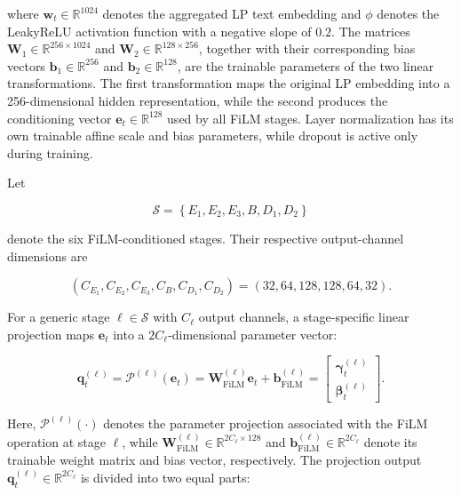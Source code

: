 where $\mathbf{w}_t\in\mathbb{R}^{1024}$ denotes the aggregated LP text
embedding and $\phi$ denotes the LeakyReLU activation function with a negative
slope of $0.2$. The matrices
$\mathbf{W}_1\in\mathbb{R}^{256\times1024}$ and
$\mathbf{W}_2\in\mathbb{R}^{128\times256}$, together with their corresponding
bias vectors $\mathbf{b}_1\in\mathbb{R}^{256}$ and
$\mathbf{b}_2\in\mathbb{R}^{128}$, are the trainable parameters of the two
linear transformations. The first transformation maps the original LP
embedding into a 256-dimensional hidden representation, while the second
produces the conditioning vector
$\mathbf{e}_t\in\mathbb{R}^{128}$ used by all FiLM stages. Layer
normalization has its own trainable affine scale and bias parameters, while
dropout is active only during training.

Let

\begin{equation}\label{eq:ch3:film_stage_set}
\mathcal{S}
=
\left\{
E_1,E_2,E_3,B,D_1,D_2
\right\}
\end{equation}

denote the six FiLM-conditioned stages. Their respective output-channel
dimensions are

\begin{equation}\label{eq:ch3:film_stage_channels}
\left(
C_{E_1},
C_{E_2},
C_{E_3},
C_B,
C_{D_1},
C_{D_2}
\right)
=
\left(
32,64,128,128,64,32
\right).
\end{equation}

For a generic stage $\ell\in\mathcal{S}$ with $C_\ell$ output channels, a
stage-specific linear projection maps $\mathbf{e}_t$ into a
$2C_\ell$-dimensional parameter vector:

\begin{equation}\label{eq:ch3:film_parameters}
\mathbf{q}^{(\ell)}_t
=
\mathcal{P}^{(\ell)}
\left(
\mathbf{e}_t
\right)
=
\mathbf{W}_{\mathrm{FiLM}}^{(\ell)}
\mathbf{e}_t
+
\mathbf{b}_{\mathrm{FiLM}}^{(\ell)}
=
\begin{bmatrix}
\boldsymbol{\gamma}^{(\ell)}_t\\
\boldsymbol{\beta}^{(\ell)}_t
\end{bmatrix}.
\end{equation}

Here, $\mathcal{P}^{(\ell)}(\cdot)$ denotes the parameter projection associated
with the FiLM operation at stage $\ell$, while
$\mathbf{W}_{\mathrm{FiLM}}^{(\ell)}
\in\mathbb{R}^{2C_\ell\times128}$ and
$\mathbf{b}_{\mathrm{FiLM}}^{(\ell)}
\in\mathbb{R}^{2C_\ell}$ denote its trainable weight matrix and bias vector,
respectively. The projection output
$\mathbf{q}^{(\ell)}_t\in\mathbb{R}^{2C_\ell}$ is divided into two equal
parts:

